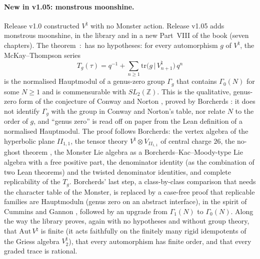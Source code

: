 \documentclass[10pt]{article}
\newcommand{\Z}{\mathbb{Z}}
\newcommand{\Vn}{V^\natural}
\begin{document}
\paragraph{New in v1.05: monstrous moonshine.} Release v1.0 constructed $\Vn$ with no Monster action. Release v1.05
adds monstrous moonshine, in the library and in a new Part~VIII of the book (seven chapters). The theorem
\,:\, has no hypotheses: for every
automorphism $g$ of $\Vn$, the McKay--Thompson series
\begin{equation*}
  T_g(\tau)=q^{-1}+\sum_{n\ge1}\mathrm{tr}\bigl(g\,|\,\Vn_{n+1}\bigr)\,q^n
\end{equation*}
is the normalised Hauptmodul of a genus-zero group $\Gamma_g$ that contains $\Gamma_0(N)$ for some $N\ge1$ and is
commensurable with $SL_2(\Z)$. This is the qualitative, genus-zero form of the conjecture of Conway and Norton
\cite{ConwayNorton}, proved by Borcherds \cite{Borcherds}: it does not identify $\Gamma_g$ with the group in Conway
and Norton's table, nor relate $N$ to the order of $g$, and ``genus zero'' is read off on paper from the Lean
definition of a normalised Hauptmodul. The proof follows Borcherds: the vertex algebra of the hyperbolic plane
$I\!I_{1,1}$, the tensor theory $\Vn\otimes V_{I\!I_{1,1}}$ of central charge $26$, the no-ghost theorem
\cite{GoddardThorn}, the Monster Lie algebra as a Borcherds--Kac--Moody-type Lie algebra with a free positive part,
the denominator identity (as the combination of two Lean theorems) and the twisted denominator identities, and
complete replicability of the $T_g$. Borcherds' last step, a class-by-class comparison that needs the character table
of the Monster, is replaced by a case-free proof that replicable families are Hauptmoduln (genus zero on an abstract
interface), in the spirit of Cummins and Gannon \cite{CumminsGannon}, followed by an upgrade from $\Gamma_1(N)$ to
$\Gamma_0(N)$. Along the way the library proves, again with no hypotheses and without group theory, that
$\mathrm{Aut}\,\Vn$ is finite (it acts faithfully on the finitely many rigid idempotents of the Griess algebra $\Vn_2$), that every automorphism has
finite order, and that every graded trace is rational.
\end{document}
